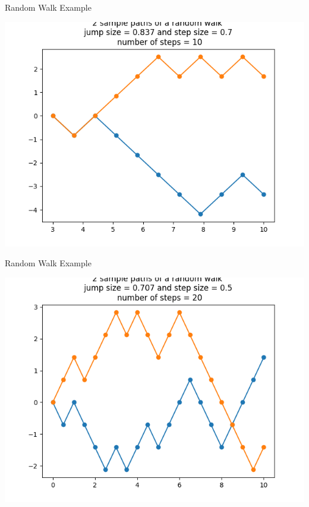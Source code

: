 \documentclass{beamer}%
\numberwithin{equation}{section}
\begin{document}
	\begin{frame}{Random Walk Example}
		\begin{center}
			\includegraphics[scale=.55]{randomwalk10steps.png}
		\end{center}
	\end{frame}
	
	\begin{frame}{Random Walk Example}
		\begin{center}
			\includegraphics[scale=.6]{randomwalk20steps.png}
		\end{center}
	\end{frame}
	
\end{document}
